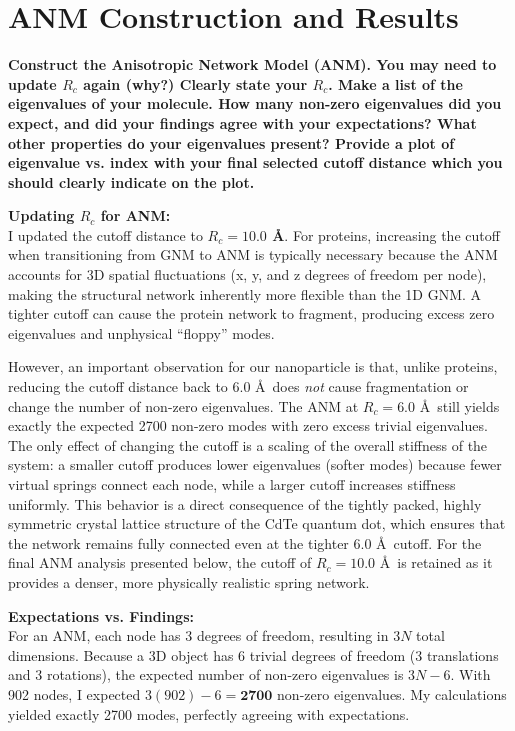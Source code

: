 \documentclass[11pt, a4paper]{article}
\begin{document}
\newpage

\section*{ANM Construction and Results}

\textbf{Construct the Anisotropic Network Model (ANM). You may need to update $R_c$ again (why?) Clearly state your $R_c$. Make a list of the eigenvalues of your molecule. How many non-zero eigenvalues did you expect, and did your findings agree with your expectations? What other properties do your eigenvalues present? Provide a plot of eigenvalue vs. index with your final selected cutoff distance which you should clearly indicate on the plot.}
\vspace{0.5cm}

\textbf{Updating $R_c$ for ANM:}\\
I updated the cutoff distance to \textbf{$R_c = 10.0$ \AA}. For proteins, increasing the cutoff when transitioning from GNM to ANM is typically necessary because the ANM accounts for 3D spatial fluctuations (x, y, and z degrees of freedom per node), making the structural network inherently more flexible than the 1D GNM. A tighter cutoff can cause the protein network to fragment, producing excess zero eigenvalues and unphysical ``floppy'' modes.

However, an important observation for our nanoparticle is that, unlike proteins, reducing the cutoff distance back to 6.0 \AA\ does \textit{not} cause fragmentation or change the number of non-zero eigenvalues. The ANM at $R_c = 6.0$ \AA\ still yields exactly the expected 2700 non-zero modes with zero excess trivial eigenvalues. The only effect of changing the cutoff is a scaling of the overall stiffness of the system: a smaller cutoff produces lower eigenvalues (softer modes) because fewer virtual springs connect each node, while a larger cutoff increases stiffness uniformly. This behavior is a direct consequence of the tightly packed, highly symmetric crystal lattice structure of the CdTe quantum dot, which ensures that the network remains fully connected even at the tighter 6.0 \AA\ cutoff. For the final ANM analysis presented below, the cutoff of $R_c = 10.0$ \AA\ is retained as it provides a denser, more physically realistic spring network.

\textbf{Expectations vs. Findings:}\\
For an ANM, each node has 3 degrees of freedom, resulting in $3N$ total dimensions. Because a 3D object has 6 trivial degrees of freedom (3 translations and 3 rotations), the expected number of non-zero eigenvalues is $3N - 6$. With 902 nodes, I expected $3(902) - 6 = \textbf{2700}$ non-zero eigenvalues. My calculations yielded exactly 2700 modes, perfectly agreeing with expectations.
\end{document}
